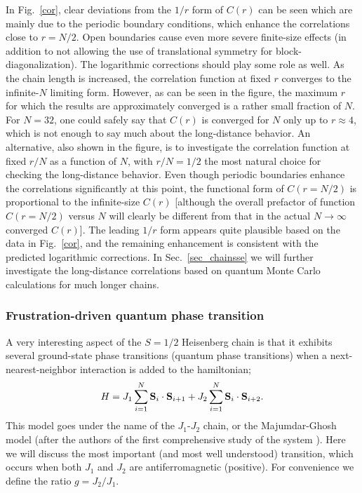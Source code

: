 \documentclass[draft,numberedheadings]{aipproc}
\begin{document}
In Fig.~\ref{cor}, clear deviations from the $1/r$ form of $C(r)$ can be seen which are mainly due to the periodic boundary conditions, which enhance the 
correlations close to $r=N/2$. Open boundaries cause even more severe finite-size effects (in addition to not allowing the use of translational symmetry for 
block-diagonalization). The logarithmic corrections should play some role as well. As the chain length is increased, the correlation function at fixed 
$r$ converges to the infinite-$N$ limiting form. However, as can be seen in the figure, the maximum $r$ for which the results are approximately converged 
is a rather small fraction of $N$. For $N=32$, one could safely say that $C(r)$ is converged for $N$ only up to $r \approx 4$, which is not enough to say 
much about the long-distance behavior. An alternative, also shown in the figure, is to investigate the correlation function at fixed $r/N$ as a function 
of $N$, with $r/N=1/2$ the most natural choice for checking the long-distance behavior. Even though periodic boundaries enhance the correlations significantly 
at this point, the functional form of $C(r=N/2)$ is proportional to the infinite-size $C(r)$ [although the overall prefactor of function $C(r=N/2)$ 
versus $N$ will clearly be different from that in the actual $N\to \infty$ converged $C(r)$]. The leading $1/r$ form appears quite plausible based on the 
data in Fig.~\ref{cor}, and the remaining enhancement is consistent with the predicted logarithmic corrections. In Sec.~\ref{sec_chainsse} we will further 
investigate the long-distance correlations based on quantum Monte Carlo calculations for much longer chains.


\subsubsection{Frustration-driven quantum phase transition}
\label{sec_j1j2chain}

A very interesting aspect of the $S=1/2$ Heisenberg chain is that it exhibits several ground-state phase transitions (quantum phase transitions) when a 
next-nearest-neighbor interaction is added to the hamiltonian; \begin{equation}
H = J_1\sum_{i=1}^N {\bf S}_i \cdot {\bf S}_{i+1} + 
J_2\sum_{i=1}^N {\bf S}_i \cdot {\bf S}_{i+2}.
\label{j1j2ham}
\end{equation}
This model goes under the name of the $J_1$-$J_2$ chain, or the Majumdar-Ghosh model (after the authors of the first comprehensive study of the system 
\cite{majumdarghosh}). Here we will discuss the most important (and most well understood) transition, which occurs when both $J_1$ and $J_2$ are 
antiferromagnetic (positive). For convenience we define the ratio $g=J_2/J_1$. 
\end{document}
